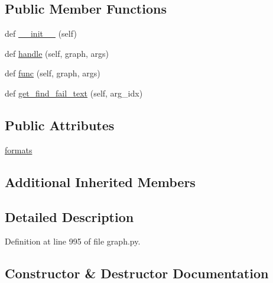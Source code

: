 \subsection*{Public Member Functions}
\begin{DoxyCompactItemize}
\item 
def \hyperlink{classlight__chats_1_1graph_1_1HitFunction_acd01defd21c4e2e69d7728458887c1b2}{\+\_\+\+\_\+init\+\_\+\+\_\+} (self)
\item 
def \hyperlink{classlight__chats_1_1graph_1_1HitFunction_afcc616271cdc3acede3dcabdfe516598}{handle} (self, graph, args)
\item 
def \hyperlink{classlight__chats_1_1graph_1_1HitFunction_a5154430a7ff1b987446b904c8238eef2}{func} (self, graph, args)
\item 
def \hyperlink{classlight__chats_1_1graph_1_1HitFunction_a3682574dfb01b39b2cec972e8a90d762}{get\+\_\+find\+\_\+fail\+\_\+text} (self, arg\+\_\+idx)
\end{DoxyCompactItemize}
\subsection*{Public Attributes}
\begin{DoxyCompactItemize}
\item 
\hyperlink{classlight__chats_1_1graph_1_1HitFunction_a52f8cfade8a8bd90e48e125bc2232e44}{formats}
\end{DoxyCompactItemize}
\subsection*{Additional Inherited Members}


\subsection{Detailed Description}
\begin{DoxyVerb}\end{DoxyVerb}
 

Definition at line 995 of file graph.\+py.



\subsection{Constructor \& Destructor Documentation}
\mbox{\label{classlight__chats_1_1graph_1_1HitFunction_acd01defd21c4e2e69d7728458887c1b2}} 

